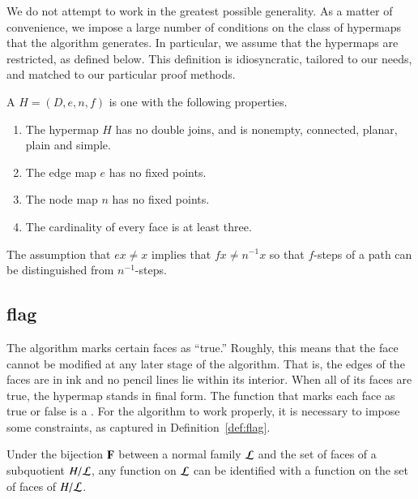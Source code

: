 We do not attempt to work in the greatest possible generality.  As a
matter of convenience, we impose a large number of conditions on the
class of hypermaps that the algorithm generates.  In particular, we
assume that the hypermaps are restricted, as defined below.  This
definition is idiosyncratic, tailored to our needs, and matched to our
particular proof methods.


\begin{definition}[restricted]\label{def:restricted}
A  $H = (D,e,n,f)$ is one with the following 
properties.
\begin{enumerate}
\item The hypermap $H$ has no double joins, and is nonempty,
  connected, planar, plain and simple.
\item The edge map $e$ has no fixed points.  %
\item The node map $n$ has no fixed points.
\item The cardinality of every face is at least three.
\end{enumerate}
%
%
\end{definition}

\begin{remark}
The assumption that $e x \ne x$ implies that $f x \ne n^{-1} x$ so that $f$-steps of a 
path can be distinguished from $n^{-1}$-steps.
\end{remark}


\subsection{flag}
%

The algorithm marks certain faces as ``true.''  Roughly, this means that
the face cannot be modified at any later stage of the algorithm.
That is, the edges of the faces are in ink and no pencil lines lie
within its interior.  When all of its faces are true, the hypermap
stands in final form.  The function that marks each face as true or
false is a .  For the algorithm to work properly, it is
necessary to impose some constraints, as captured in
Definition~\ref{def:flag}.  %


Under the bijection ${\mathbf F}$ between a normal family ${\cal L}$ and the
set of faces of a subquotient $H/{\cal L}$, any function 
on ${\cal L}$ can be identified with a function  on the
set of faces of $H/{\cal L}$.   

